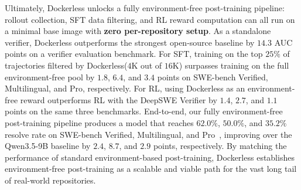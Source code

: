\documentclass[]{arxiv_template}
\newcommand{\approach}{Dockerless\xspace}
\newcommand{\zeng}[1]{\textcolor[rgb]{1,0.66,0}{\textbf{[Zeng: #1]}}}
\newcommand{\he}[1]{\textcolor{blue}{\textbf{[He: #1]}}}
\begin{document}
Ultimately, \approach unlocks a fully environment-free post-training pipeline: rollout collection, SFT data filtering, and RL reward computation can all run on a minimal base image with \textbf{zero per-repository setup}.
As a standalone verifier, \approach outperforms the strongest open-source baseline by $14.3$ AUC points on a verifier evaluation benchmark.
For SFT, training on the top $25\%$ of trajectories filtered by \approach ($4$K out of $16$K) surpasses training on the full environment-free pool by $1.8$, $6.4$, and $3.4$ points on SWE-bench Verified, Multilingual, and Pro, respectively.
For RL, using \approach as an environment-free reward outperforms RL with the DeepSWE Verifier by $1.4$, $2.7$, and $1.1$ points on the same three benchmarks.
End-to-end, our fully environment-free post-training pipeline produces a model that reaches $62.0\%$, $50.0\%$, and $35.2\%$ resolve rate on SWE-bench Verified, Multilingual, and Pro~\citep{jimenez2024swe,openai2024introducing,yang2025swe,deng2025swe}, improving over the Qwen3.5-9B baseline by $2.4$, $8.7$, and $2.9$ points, respectively.
By matching the performance of standard environment-based post-training, \approach establishes environment-free post-training as a scalable and viable path for the vast long tail of real-world repositories.
\end{document}
